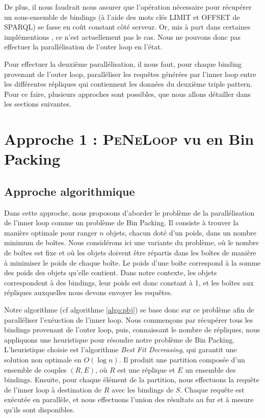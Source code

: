 \documentclass[a4paper]{article}
\def\sparql{\textsc{SPARQL}\xspace}
\def\peneloop{\textsc{PeNeLoop}\xspace}
\begin{document}
De plus, il nous faudrait nous assurer que l'opération nécessaire pour récupérer un sous-ensemble de bindings (à l'aide des mots clés \textsc{LIMIT} et \textsc{OFFSET} de \sparql) se fasse en coût constant côté serveur. Or, mis à part dans certaines implémentions \cite{gimenez2015hdt}, ce n'est actuellement pas le cas. Nous ne pouvons donc pas effectuer la parallélisation de l'outer loop en l'état.

Pour effectuer la deuxième parallélisation, il nous faut, pour chaque binding provenant de l'outer loop, paralléliser les requêtes générées par l'inner loop entre les différentes répliques qui contiennent les données du deuxième triple pattern. Pour ce faire, plusieurs approches sont possibles, que nous allons détailler dans les sections suivantes.

\section{Approche 1 : \peneloop vu en Bin Packing}

\subsection{Approche algorithmique}

Dans cette approche, nous proposons d'aborder le problème de la parallélisation de l'inner loop comme un problème de Bin Packing. Il consiste à trouver la manière optimale pour ranger $n$ objets, chacun doté d'un poids, dans un nombre minimum de boîtes. Nous considérons ici une variante du problème, où le nombre de boîtes est fixe et où les objets doivent être répartis dans les boîtes de manière à minimiser le poids de chaque boîte. Le poids d'une boîte correspond à la somme des poids des objets qu'elle contient. Dans notre contexte, les objets correspondent à des bindings, leur poids est donc constant à 1, et les boîtes aux répliques auxquelles nous devons envoyer les requêtes.

Notre algorithme (cf algorithme \ref{algo:pbj}) se base donc sur ce problème afin de paralléliser l'exéuction de l'inner loop. Nous commençons par récupérer tous les bindings provenant de l'outer loop, puis, connaissant le nombre de répliques, nous appliquons une heuristique pour résoudre notre problème de Bin Packing. L'heuristique choisie est l'algorithme \textit{Best Fit Decreasing}, qui garantit une solution non optimale en $O(\log n)$. Il produit une partition composée d'un ensemble de couples $(R, E)$, où $R$ est une réplique et $E$ un ensemble des bindings. Ensuite, pour chaque élément de la partition, nous effectuons la requête de l'inner loop à destination de $R$ avec les bindings de $S$. Chaque requête est exécutée en parallèle, et nous effectuons l'union des résultats au fur et à mesure qu'ils sont disponibles.
\end{document}
